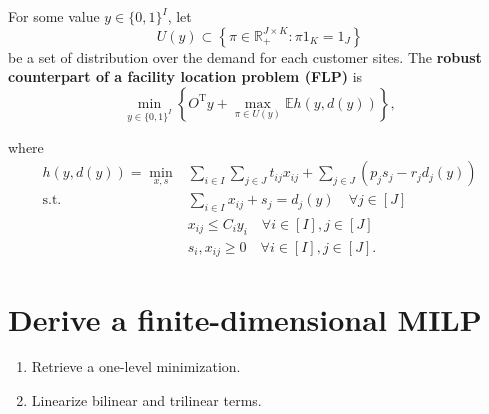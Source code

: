 \documentclass{beamer}
\newcommand{\R}{\mathbb{R}}
\newcommand{\T}{\mathrm{T}}
\newcommand{\E}{\mathbb{E}}
\begin{document}
\begin{frame}[allowframebreaks]
		\framebreak
		\begin{definition}
			For some value $y \in \{0, 1\}^{I}$, let
			\begin{equation*}
				U(y) \subset \left\{\pi \in \R_+^{J \times K}: \pi 1_K = 1_J\right\}
			\end{equation*}
			be a set of distribution over the demand for each customer sites. The \textbf{robust counterpart of a facility location problem (FLP)} is
			\begin{equation} \label{eq:outterproblem}
				\min_{y \in \{0, 1\}^I} \left\{O^\T y + \max_{\pi \in U(y)} \E h(y, d(y))\right\},
			\end{equation}
		\end{definition}
		\framebreak
		\begin{definition}
			where
			\begin{subequations}
				\label{eq:innerproblem}
				\begin{align}
					h(y, d(y)) = \min_{x, s} &\sum_{i \in I} \sum_{j \in J} t_{ij}x_{ij} + \sum_{j \in J} (p_j s_j - r_j d_j(y)) \\
					\text{s.t.} &\sum_{i \in I} x_{ij} + s_j = d_j(y) \quad \forall j \in [J] \\
					&x_{ij} \le C_i y_i \quad \forall i \in [I], j \in [J] \\
					&s_i, x_{ij} \ge 0 \quad \forall i \in [I], j \in [J].
				\end{align}
			\end{subequations}
		\end{definition}
	\end{frame}
	
	\section{Derive a finite-dimensional MILP} %
	\begin{frame}
		\begin{enumerate}
			\item Retrieve a one-level minimization.
			\item Linearize bilinear and trilinear terms.
		\end{enumerate}
	\end{frame}
	
\end{document}
